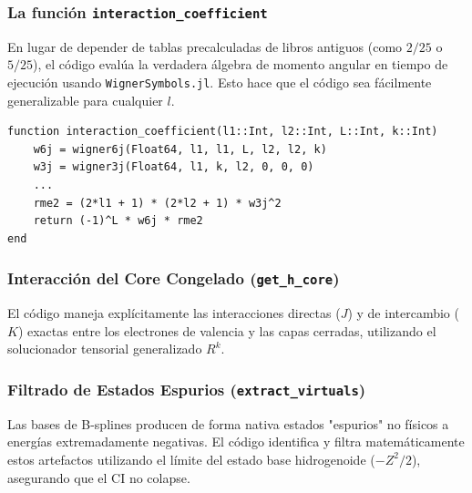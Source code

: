 \documentclass[11pt,a4paper]{article}
\begin{document}
\subsubsection{La función \texttt{interaction\_coefficient}}
En lugar de depender de tablas precalculadas de libros antiguos (como $2/25$ o $5/25$), el código evalúa la verdadera álgebra de momento angular en tiempo de ejecución usando \texttt{WignerSymbols.jl}. Esto hace que el código sea fácilmente generalizable para cualquier $l$.
\begin{verbatim}
function interaction_coefficient(l1::Int, l2::Int, L::Int, k::Int)
    w6j = wigner6j(Float64, l1, l1, L, l2, l2, k)
    w3j = wigner3j(Float64, l1, k, l2, 0, 0, 0)
    ...
    rme2 = (2*l1 + 1) * (2*l2 + 1) * w3j^2
    return (-1)^L * w6j * rme2
end
\end{verbatim}

\subsubsection{Interacción del Core Congelado (\texttt{get\_h\_core})}
El código maneja explícitamente las interacciones directas ($J$) y de intercambio ($K$) exactas entre los electrones de valencia y las capas cerradas, utilizando el solucionador tensorial generalizado $R^k$.

\subsubsection{Filtrado de Estados Espurios (\texttt{extract\_virtuals})}
Las bases de B-splines producen de forma nativa estados "espurios" no físicos a energías extremadamente negativas. El código identifica y filtra matemáticamente estos artefactos utilizando el límite del estado base hidrogenoide ($-Z^2 / 2$), asegurando que el CI no colapse.
\end{document}
